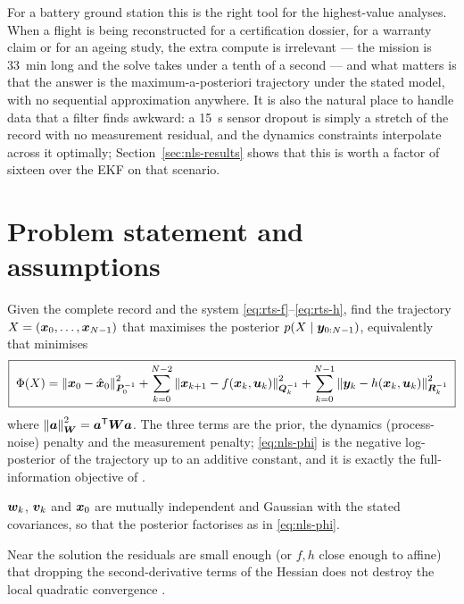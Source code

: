 For a battery ground station this is the right tool for the highest-value analyses.  When a flight
is being reconstructed for a certification dossier, for a warranty claim or for an ageing study, the
extra compute is irrelevant --- the mission is \SI{33}{\minute} long and the solve takes under a
tenth of a second --- and what matters is that the answer is the maximum-a-posteriori trajectory
under the stated model, with no sequential approximation anywhere.  It is also the natural place to
handle data that a filter finds awkward: a \SI{15}{\second} sensor dropout is simply a stretch of
the record with no measurement residual, and the dynamics constraints interpolate across it
optimally; Section~\ref{sec:nls-results} shows that this is worth a factor of sixteen over the EKF
on that scenario.

\section{Problem statement and assumptions}
Given the complete record and the system \eqref{eq:rts-f}--\eqref{eq:rts-h}, find the trajectory
$X=(\bm{x}_0,\dots,\bm{x}_{N-1})$ that maximises the posterior $p(X\mid \bm{y}_{0:N-1})$, equivalently that
minimises
\begin{equation}
\boxed{\;
\Phi(X)=\left\lVert \bm{x}_0-\hat{\bm{x}}_0 \right\rVert^2_{\bm{P}_0^{-1}}
+\sum_{k=0}^{N-2}\left\lVert \bm{x}_{k+1}-f(\bm{x}_k,\bm{u}_k) \right\rVert^2_{\bm{Q}_k^{-1}}
+\sum_{k=0}^{N-1}\left\lVert \bm{y}_k-h(\bm{x}_k,\bm{u}_k) \right\rVert^2_{\bm{R}_k^{-1}}\;}
\label{eq:nls-phi}
\end{equation}
where $\left\lVert \bm a \right\rVert^2_{\bm{W}}=\bm a^{\mathsf{T}}\bm{W}\bm a$.  The three terms are the prior, the dynamics
(process-noise) penalty and the measurement penalty; \eqref{eq:nls-phi} is the negative
log-posterior of the trajectory up to an additive constant, and it is exactly the full-information
objective of \cite[Ch.~4]{rawlings2017mpc}.

\begin{assumption}[Independence]\label{as:nls-indep}
$\bm{w}_k$, $\bm{v}_k$ and $\bm{x}_0$ are mutually independent and Gaussian with the stated covariances, so
that the posterior factorises as in \eqref{eq:nls-phi}.
\end{assumption}

\begin{assumption}\label{as:nls-gn}
Near the solution the residuals are small enough (or $f,h$ close enough to affine) that dropping the
second-derivative terms of the Hessian does not destroy the local quadratic convergence
\cite[Ch.~10]{nocedal2006}.
\end{assumption}

